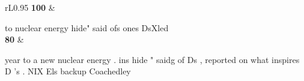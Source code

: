 {\begin{tabular}{rL{0.95\linewidth}}
\textbf{100} &\strut{}\smallmasktok{} \smallmasktok{}\smallmasktok{}\smallmasktok{}\smallmasktok{}\smallmasktok{} to\smallmasktok{}\smallmasktok{}\smallmasktok{}\smallmasktok{}\smallmasktok{}\smallmasktok{}\smallmasktok{}\smallmasktok{}\smallmasktok{}\smallmasktok{}\smallmasktok{} nuclear energy\smallmasktok{}\smallmasktok{}\smallmasktok{}\smallmasktok{}\smallmasktok{}\smallmasktok{}\smallmasktok{}\smallmasktok{}\smallmasktok{}\smallmasktok{}\smallmasktok{}\smallmasktok{}\smallmasktok{}\smallmasktok{}\smallmasktok{}\smallmasktok{}\smallmasktok{}\smallmasktok{}\smallmasktok{}\smallmasktok{}\smallmasktok{}\smallmasktok{}\smallmasktok{} hide\smallmasktok{}\smallmasktok{}\smallmasktok{}\smallmasktok{}\smallmasktok{}\smallmasktok{}\smallmasktok{}" said\smallmasktok{}\smallmasktok{}\smallmasktok{}\smallmasktok{}\smallmasktok{}\smallmasktok{}\smallmasktok{}\smallmasktok{} of\smallmasktok{}\smallmasktok{}\smallmasktok{}\smallmasktok{}\smallmasktok{}\smallmasktok{}\smallmasktok{}\smallmasktok{}\smallmasktok{}s \smallmasktok{}\smallmasktok{}\smallmasktok{}\smallmasktok{}\smallmasktok{} on\smallmasktok{}\smallmasktok{}es\smallmasktok{}\smallmasktok{} D\smallmasktok{}\smallmasktok{}s\smallmasktok{}\smallmasktok{}\smallmasktok{}\smallmasktok{}\smallmasktok{}X\smallmasktok{}\smallmasktok{}\smallmasktok{}\smallmasktok{}\smallmasktok{}\smallmasktok{}\smallmasktok{}\smallmasktok{}\smallmasktok{}\smallmasktok{}\smallmasktok{}l\smallmasktok{}\smallmasktok{}\smallmasktok{}\smallmasktok{}\smallmasktok{}\smallmasktok{}\smallmasktok{}\smallmasktok{}\smallmasktok{}\smallmasktok{}\smallmasktok{}\smallmasktok{}ed\smallmasktok{} \smallmasktok{}\smallmasktok{}\smallmasktok{}\smallmasktok{}\smallmasktok{}\smallmasktok{}\\
\textbf{80} &\strut{}\smallmasktok{} \smallmasktok{}\smallmasktok{} year\smallmasktok{}\smallmasktok{} to\smallmasktok{}\smallmasktok{}\smallmasktok{}\smallmasktok{}\smallmasktok{}\smallmasktok{} a new\smallmasktok{}\smallmasktok{}\smallmasktok{} nuclear energy .\smallmasktok{}\smallmasktok{}\smallmasktok{}\smallmasktok{}\smallmasktok{}\smallmasktok{}\smallmasktok{}\smallmasktok{}\smallmasktok{}\smallmasktok{}\smallmasktok{}\smallmasktok{}\smallmasktok{} ins\smallmasktok{}\smallmasktok{}\smallmasktok{}\smallmasktok{}\smallmasktok{}\smallmasktok{}\smallmasktok{} hide\smallmasktok{}\smallmasktok{}\smallmasktok{}\smallmasktok{}\smallmasktok{}\smallmasktok{} " said\smallmasktok{}\smallmasktok{}\smallmasktok{}g\smallmasktok{}\smallmasktok{}\smallmasktok{}\smallmasktok{} of\smallmasktok{}\smallmasktok{}\smallmasktok{}\smallmasktok{} D\smallmasktok{}\smallmasktok{}\smallmasktok{}\smallmasktok{}s ,\smallmasktok{} reported\smallmasktok{}\smallmasktok{} on what inspires\smallmasktok{}\smallmasktok{} D\smallmasktok{} 's . \smallmasktok{}NIX \smallmasktok{}\smallmasktok{}\smallmasktok{}E\smallmasktok{}\smallmasktok{}\smallmasktok{}\smallmasktok{}\smallmasktok{}\smallmasktok{}l\smallmasktok{}\smallmasktok{}s\smallmasktok{} backup\smallmasktok{}\smallmasktok{}\smallmasktok{}\smallmasktok{} Coach\smallmasktok{}edley \smallmasktok{}\smallmasktok{}\smallmasktok{}\smallmasktok{}\smallmasktok{}\smallmasktok{}\\

\end{tabular}}
